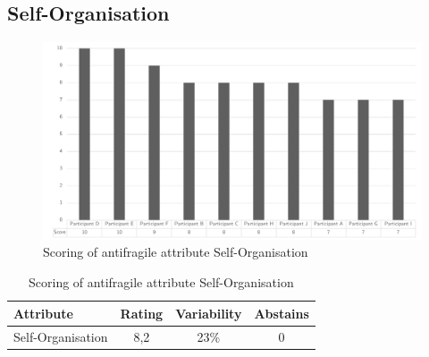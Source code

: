\subsection{Self-Organisation}
\begin{figure}[H]
	\centering
	\includegraphics[width=0.9\linewidth]{images/scoreafselforganisation}
	\caption[Scoring of antifragile attribute Self-Organisation]{Scoring of antifragile attribute Self-Organisation}
	\label{fig:appscoringafselforganisation}
\end{figure}
\begin{table}[H]
	\centering
	\begin{tabular}{p{}ccc}
		\toprule
		\textbf{Attribute} & \textbf{Rating} & \textbf{Variability} & \textbf{Abstains} \\
		\midrule
		Self-Organisation & 8,2 & 23\% & 0 \\%
		\bottomrule
	\end{tabular}%
	\caption[Scoring of antifragile attribute Self-Organisation]{Scoring of antifragile attribute Self-Organisation}
	\label{tab:appscoringafselforganisation}%
\end{table}%
\newpage

